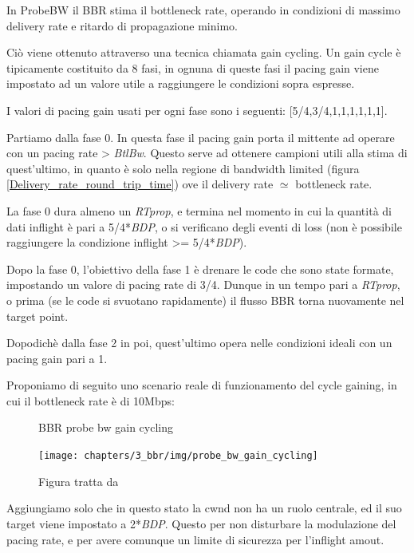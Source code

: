 In ProbeBW il BBR stima il bottleneck rate, operando in condizioni di massimo delivery rate e ritardo di propagazione minimo. \bigskip

Ciò viene ottenuto attraverso una tecnica chiamata gain cycling. Un gain cycle è tipicamente costituito da 8 fasi, in ognuna di queste fasi il pacing gain viene impostato ad un valore utile a raggiungere le condizioni sopra espresse. \bigskip

I valori di pacing gain usati per ogni fase sono i seguenti: [5/4,3/4,1,1,1,1,1,1]. \bigskip

Partiamo dalla fase 0. In questa fase il pacing gain porta il mittente ad operare con un pacing rate > \textit{BtlBw}. Questo serve ad ottenere campioni utili alla stima di quest'ultimo, in quanto è solo nella regione di bandwidth limited (figura \ref{Delivery_rate_round_trip_time}) ove il delivery rate $ \simeq $ bottleneck rate. \bigskip

La fase 0 dura almeno un \textit{RTprop}, e termina nel momento in cui la quantità di dati inflight è pari a 5/4*\textit{BDP}, o si verificano degli eventi di loss (non è possibile raggiungere la condizione inflight >= 5/4*\textit{BDP}). \bigskip

Dopo la fase 0, l'obiettivo della fase 1 è drenare le code che sono state formate, impostando un valore di pacing rate di 3/4. Dunque in un tempo pari a \textit{RTprop}, o prima (se le code si svuotano rapidamente) il flusso BBR torna nuovamente nel target point. \bigskip

Dopodichè dalla fase 2 in poi, quest'ultimo opera nelle condizioni ideali con un pacing gain pari a 1. \bigskip 

Proponiamo di seguito uno scenario reale di funzionamento del cycle gaining, in cui il bottleneck rate è di 10Mbps:

\begin{figure}[H]

\center
\caption{BBR probe bw gain cycling}
\texttt{[image: chapters/3\_bbr/img/probe\_bw\_gain\_cycling]}
\caption*{Figura tratta da \cite[p.~62]{Cardwell:2017:BCC:3042068.3009824}}

\end{figure}   
   
Aggiungiamo solo che in questo stato la cwnd non ha un ruolo centrale, ed il suo target viene impostato a 2*\textit{BDP}. Questo per non disturbare la modulazione del pacing rate, e per avere comunque un limite di sicurezza per l'inflight amout.

